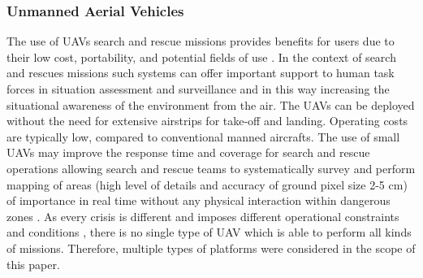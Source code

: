 \documentclass{article}
\begin{document}
\subsubsection{Unmanned Aerial Vehicles}
The use of UAVs search and rescue missions provides benefits for users due to their low cost, portability, and potential fields of use \cite{tomic}.
In the context of search and rescues missions such systems can offer important support to human task forces in situation assessment and surveillance and in this way increasing the situational awareness of the environment from the air.
The UAVs can be deployed without the need for extensive airstrips for take-off and landing. Operating costs are typically low, compared to conventional manned aircrafts.
The use of small UAVs may improve the response time and coverage for search and rescue operations allowing search and rescue teams to systematically survey and perform mapping of areas (high level of details and accuracy of ground pixel size 2-5 cm) of importance in real time without any physical interaction within dangerous zones \cite{Erdos}\cite{Nagai}.
As every crisis is different and imposes different operational constraints and conditions \cite{URD}, there is no single type of UAV which is able to perform all kinds of missions.
Therefore, multiple types of platforms were considered in the scope of this paper.
\end{document}
